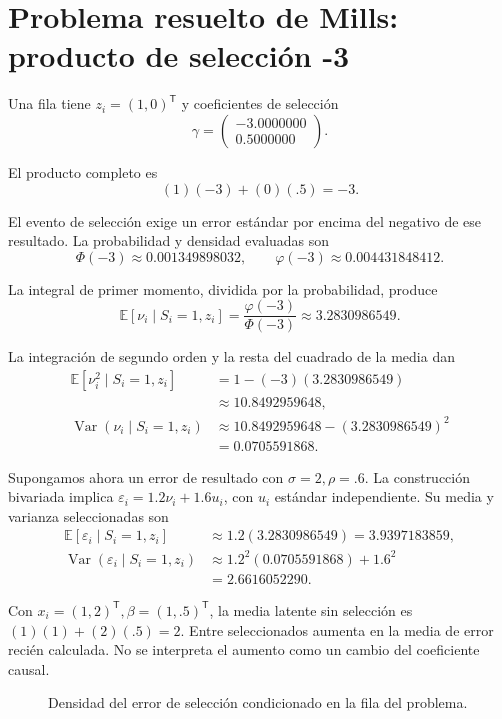 \documentclass[11pt,a4paper]{article}
\newcommand{\E}{\mathbb E}
\newcommand{\T}{^{\mathsf T}}
\DeclareMathOperator{\Var}{Var}
\begin{document}
\clearpage
\section{Problema resuelto de Mills: producto de selección -3}\label{unidad78}
Una fila tiene \(z_i=(1,0)\T\)
y coeficientes de selección
\[
\gamma=\begin{pmatrix}-3.0000000\\0.5000000\end{pmatrix}.
\]

El producto completo es
\[
(1)(-3)+(0)(.5)=-3.
\]

El evento de selección exige un error estándar
por encima del negativo de ese resultado.
La probabilidad y densidad evaluadas son
\[
\Phi(-3)\approx0.001349898032,\qquad\varphi(-3)\approx0.004431848412.
\]

La integral de primer momento, dividida
por la probabilidad, produce
\[
\E[\nu_i\mid S_i=1,z_i]
=\frac{\varphi(-3)}{\Phi(-3)}
\approx3.2830986549.
\]

La integración de segundo orden y
la resta del cuadrado de la media dan
\[
\begin{aligned}
\E[\nu_i^2\mid S_i=1,z_i]&=1-(-3)(3.2830986549)\\
&\approx10.8492959648,\\
\Var(\nu_i\mid S_i=1,z_i)&\approx10.8492959648-(3.2830986549)^2\\
&=0.0705591868.\end{aligned}
\]

Supongamos ahora un error de resultado con
\(\sigma=2,\rho=.6\).
La construcción bivariada implica
\(\varepsilon_i=1.2\nu_i+1.6u_i\),
con \(u_i\) estándar independiente.
Su media y varianza seleccionadas son
\[
\begin{aligned}
\E[\varepsilon_i\mid S_i=1,z_i]&\approx1.2(3.2830986549)
=3.9397183859,\\
\Var(\varepsilon_i\mid S_i=1,z_i)&\approx1.2^2(0.0705591868)+1.6^2\\
&=2.6616052290.\end{aligned}
\]

Con \(x_i=(1,2)\T,\beta=(1,.5)\T\),
la media latente sin selección es
\((1)(1)+(2)(.5)=2\).
Entre seleccionados aumenta en
la media de error recién calculada.
No se interpreta el aumento como
un cambio del coeficiente causal.


\begin{figure}[H]\centering
{}
\caption{Densidad del error de selección condicionado en la fila del problema.}
\end{figure}
\end{document}
